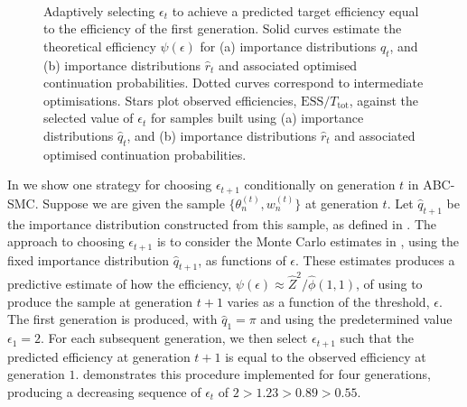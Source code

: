 \documentclass[review,demo]{siamonline190516}
\begin{document}
\begin{figure}
    \centering
    ~
    \caption{
    Adaptively selecting $\epsilon_t$ to achieve a predicted target efficiency equal to the efficiency of the first generation. 
    Solid curves estimate the theoretical efficiency $\psi(\epsilon)$ for (a) importance distributions $\hat q_t$, and (b) importance distributions $\hat r_t$ and associated optimised continuation probabilities.
    Dotted curves correspond to intermediate optimisations.
    Stars plot observed efficiencies, $\mathrm{ESS}/T_{\mathrm{tot}}$, against the selected value of $\epsilon_t$ for samples built using (a) importance distributions $\hat q_t$, and (b) importance distributions $\hat r_t$ and associated optimised continuation probabilities.
    }
    \label{fig:adaptive}
\end{figure}

In  we show one strategy for choosing $\epsilon_{t+1}$ conditionally on generation $t$ in ABC-SMC.
Suppose we are given the sample $\{ \theta_n^{(t)}, w_n^{(t)} \}$ at generation $t$.
Let $\hat q_{t+1}$ be the importance distribution constructed from this sample, as defined in .
The approach to choosing $\epsilon_{t+1}$ is to consider the Monte Carlo estimates in , using the fixed importance distribution $\hat q_{t+1}$, as functions of $\epsilon$.
These estimates produces a predictive estimate of how the efficiency, $\psi(\epsilon) \approx \hat Z^2 / \hat \phi(1,1)$, of using  to produce the sample at generation $t+1$ varies as a function of the threshold, $\epsilon$.
The first generation is produced, with $\hat q_1 = \pi$ and using the predetermined value $\epsilon_1 = 2$.
For each subsequent generation, we then select $\epsilon_{t+1}$ such that the predicted efficiency at generation $t+1$ is equal to the observed efficiency at generation $1$.
 demonstrates this procedure implemented for four generations, producing a decreasing sequence of $\epsilon_t$ of $2 > 1.23 > 0.89 > 0.55$.
\end{document}
